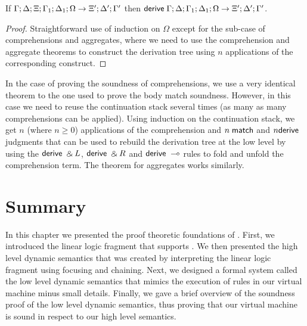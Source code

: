 \begin{lemma}[Derivation]
   If $\do \Gamma; \Delta; \Xi; \Gamma_1; \Delta_1; \Omega \rightarrow \Xi'; \Delta'; \Gamma'$ then $\mathsf{derive} \; \Gamma; \Delta; \Gamma_1; \Delta_1; \Omega \rightarrow \Xi'; \Delta'; \Gamma'$.
\end{lemma}
\begin{proof}
   Straightforward use of induction on $\Omega$ except for the sub-case of comprehensions and aggregates, where we need to use the comprehension and aggregate theorems to construct the derivation tree using $n$ applications of the corresponding construct.
\end{proof}

In the case of proving the soundness of comprehensions, we use a very identical theorem to the one used
to prove the body match soundness. However, in this case we need to reuse the continuation stack several
times (as many as many comprehensions can be applied). Using induction on the continuation stack, we get
$n$ (where $n \ge 0$) applications of the comprehension and $n \; \mathsf{match}$ and $n \mathsf{derive}$ judgments
that can be used to rebuild the derivation tree at the low level by using the $\mathsf{derive} \; \mathbin{\binampersand} L$, $\mathsf{derive} \; \mathbin{\binampersand} R$
and $\mathsf{derive} \; \multimap$ rules to fold and unfold the comprehension term. The theorem for aggregates works similarly.

\section{Summary}

In this chapter we presented the proof theoretic foundations of \lang.
First, we introduced the linear logic fragment that supports \lang. We then presented the
high level dynamic semantics that was created by interpreting the linear logic fragment using
focusing and chaining. Next, we designed
a formal system called the low level dynamic semantics that mimics the execution of rules in
our virtual machine minus small details.
Finally, we gave a brief overview of the soundness proof of the low level dynamic semantics,
thus proving that our virtual machine is sound in respect to our high level semantics.

